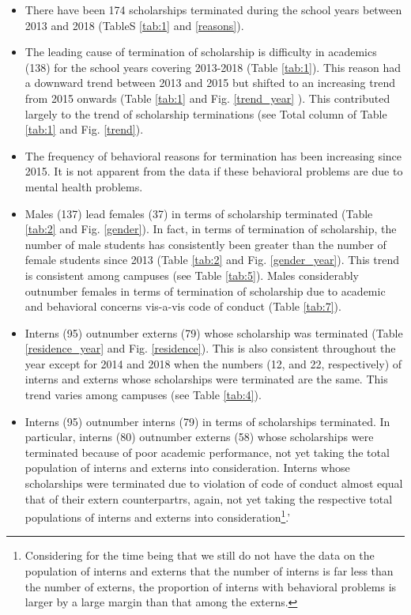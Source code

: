 \documentclass[a4paper]{article}
\providecommand{\tightlist}{%
  \setlength{\itemsep}{0pt}\setlength{\parskip}{0pt}}
\let\rmarkdownfootnote\footnote%
\def\footnote{\protect\rmarkdownfootnote}
\begin{document}
\begin{itemize}
\tightlist
\item
  There have been 174 scholarships terminated during the school years
  between 2013 and 2018 (TableS \ref{tab:1} and \ref{reasons}).
\item
  The leading cause of termination of scholarship is difficulty in
  academics (138) for the school years covering 2013-2018 (Table
  \ref{tab:1}). This reason had a downward trend between 2013 and 2015
  but shifted to an increasing trend from 2015 onwards (Table
  \ref{tab:1} and Fig. \ref{trend_year} ). This contributed largely to
  the trend of scholarship terminations (see Total column of Table
  \ref{tab:1} and Fig. \ref{trend}).
\item
  The frequency of behavioral reasons for termination has been
  increasing since 2015. It is not apparent from the data if these
  behavioral problems are due to mental health problems.
\item
  Males (137) lead females (37) in terms of scholarship terminated
  (Table \ref{tab:2} and Fig. \ref{gender}). In fact, in terms of
  termination of scholarship, the number of male students has
  consistently been greater than the number of female students since
  2013 (Table \ref{tab:2} and Fig. \ref{gender_year}). This trend is
  consistent among campuses (see Table \ref{tab:5}). Males considerably
  outnumber females in terms of termination of scholarship due to
  academic and behavioral concerns vis-a-vis code of conduct (Table
  \ref{tab:7}).
\item
  Interns (95) outnumber externs (79) whose scholarship was terminated
  (Table \ref{residence_year} and Fig. \ref{residence}). This is also
  consistent throughout the year except for 2014 and 2018 when the
  numbers (12, and 22, respectively) of interns and externs whose
  scholarships were terminated are the same. This trend varies among
  campuses (see Table \ref{tab:4}).
\item
  Interns (95) outnumber interns (79) in terms of scholarships
  terminated. In particular, interns (80) outnumber externs (58) whose
  scholarships were terminated because of poor academic performance, not
  yet taking the total population of interns and externs into
  consideration. Interns whose scholarships were terminated due to
  violation of code of conduct almost equal that of their extern
  counterpartrs, again, not yet taking the respective total populations
  of interns and externs into consideration\footnote{Considering for the
    time being that we still do not have the data on the population of
    interns and externs that the number of interns is far less than the
    number of externs, the proportion of interns with behavioral
    problems is larger by a large margin than that among the externs.}.'
\end{itemize}
\end{document}
